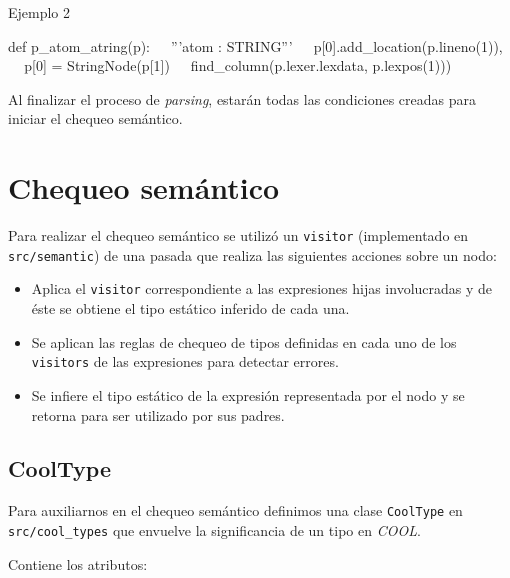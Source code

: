 \documentclass[a4paper,10pt,twocolumn]{article}
\begin{document}
\begin{algorithm}
	\caption{Ejemplo 2}
	\begin{algorithmic}
		\STATE def p\_atom\_atring(p):
		\STATE $\;\;\; $ '''atom : STRING'''
		\STATE $\;\;\; $ p[0].add\_location(p.lineno(1)),
		\STATE $\;\;\; $ p[0] = StringNode(p[1])
		\STATE $\;\;\; $ find\_column(p.lexer.lexdata, p.lexpos(1)))
	\end{algorithmic}
\end{algorithm}

Al finalizar el proceso de \textit{parsing}, estarán todas las condiciones creadas para iniciar el chequeo semántico.

\section{Chequeo semántico}

Para realizar el chequeo semántico se utilizó un \lstinline|visitor| (implementado en \lstinline|src/semantic|) de una pasada que realiza las siguientes acciones sobre un nodo:

\begin{itemize}
	\item Aplica el \lstinline|visitor| correspondiente a las expresiones hijas involucradas y de éste se obtiene el tipo estático inferido de cada una. 
	\item Se aplican las reglas de chequeo de tipos definidas en cada uno de los \lstinline|visitors| de las expresiones para detectar errores. 
	\item Se infiere el tipo estático de la expresión representada por el nodo y se retorna para ser utilizado por sus padres. 
\end{itemize}

\subsection{CoolType}
Para auxiliarnos en el chequeo semántico definimos una clase \lstinline|CoolType| en \lstinline|src/cool_types| que envuelve la significancia de un tipo en \textit{COOL}. 

Contiene los atributos:
\end{document}
